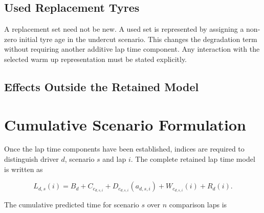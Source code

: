 
\subsection{Used Replacement Tyres}
\label{subsec:used-tyres}

A replacement set need not be new. A used set is represented by assigning a
non-zero initial tyre age in the undercut scenario. This changes the degradation
term without requiring another additive lap time component. Any interaction
with the selected warm up representation must be stated explicitly.

\subsection{Effects Outside the Retained Model}
\label{subsec:optional-effects}


\section{Cumulative Scenario Formulation}
\label{sec:cumulative-formulation}

Once the lap time components have been established, indices are required to
distinguish driver $d$, scenario $s$ and lap $i$. The complete retained lap time
model is written as

\begin{equation}
L_{d,s}(i)=B_d+C_{c_{d,s,i}}+D_{c_{d,s,i}}(a_{d,s,i})
            +W_{c_{d,s,i}}(i)+R_d(i).
\label{eq:complete-lap-time-model}
\end{equation}


The cumulative predicted time for scenario $s$ over $n$ comparison laps is

